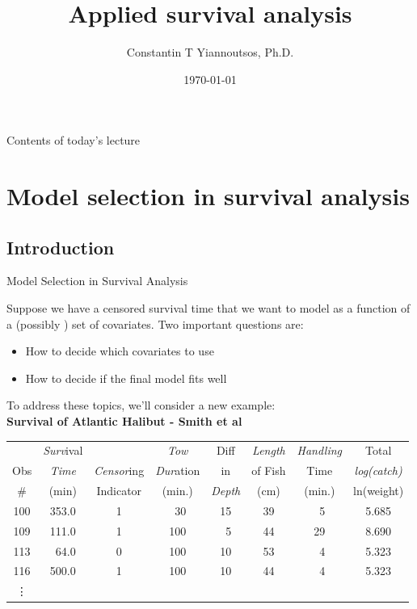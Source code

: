 \documentclass[envcountsect, 10pt, portrait, palatino]{beamer}
\title[]{Applied survival analysis}
\author[Constantin T Yiannoutsos]
{ Constantin T Yiannoutsos, Ph.D.}
\date[]{\today}
\begin{document}
\begin{frame}
  \titlepage
\end{frame}
\begin{frame}{Contents of today's lecture}
  \tableofcontents
\end{frame}
\section{Model selection in survival analysis}
\subsection{Introduction}
\begin{frame}{Model Selection in Survival Analysis}

Suppose we have a censored survival time that we want to model
as a function of a (possibly ) set of covariates.  Two important
questions are:

\begin{itemize}
\item  How to decide which covariates to use
\item  How to decide if the final model fits well
\end{itemize}
To address these topics, we'll consider a new example:
\\[2ex]
{\bf Survival of Atlantic Halibut - Smith et al}
\small
\begin{center}
\begin{tabular}{cccccccc}
\hline
     & {\it Surv}ival &           & {\it Tow}      & Diff & {\it Length}
& {\it Handling } & Total \\
 Obs & {\it Time} & {\it Censor}ing & {\it Dur}ation & in   &  of Fish
&  Time    & {\it log(catch)} \\
 \# & (min)  & Indicator & (min.) & {\it Depth} & (cm) &
(min.) & ln(weight) \\ \hline
 100 &  353.0 &  1  & ~30 & 15 &  39  & ~5 &  5.685 \\
 109 &  111.0 &  1  & 100 & ~5 &  44  & 29 &  8.690 \\
 113 &  ~64.0 &  0  & 100 & 10 &  53  & ~4 &  5.323 \\
 116 &  500.0 &  1  & 100 & 10 &  44  & ~4 &  5.323 \\
\vdots \\
 \hline
\end{tabular}
\end{center}
\end{frame}
\end{document}
